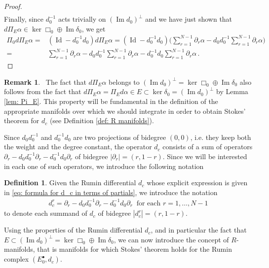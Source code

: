 \documentclass[dvipsnames]{amsart}
\theoremstyle{definition}
\newtheorem{definition}[theorem]{Definition}
\newtheorem{remark}[theorem]{Remark}
\theoremstyle{definition}
\numberwithin{equation}{section}
\begin{document}
\begin{proof}
\begin{align*}
\end{align*}
Finally, since $d_0^{-1}$ acts trivially on $(\operatorname{Im}d_0)^\perp$ and we have just shown that $d\Pi_E\alpha\in\ker\Box_0\oplus\operatorname{Im}\delta_0$, we get
\begin{align*}
    \Pi_0d\Pi_E\alpha=&\left(\operatorname{Id}-d_0^{-1}d_0\right)d\Pi_E\alpha=\left(\operatorname{Id}-d_0^{-1}d_0\right)\bigg(\sum_{r=1}^{N-1}\partial_r\alpha-d_0d_0^{-1}\sum_{r=1}^{N-1}\partial_r\alpha\bigg)\\=&\sum_{r=1}^{N-1}\partial_r\alpha-d_0d_0^{-1}\sum_{r=1}^{N-1}\partial_r\alpha-d_0^{-1}d_0\sum_{r=1}^{N-1}\partial_r\alpha\,.
\end{align*}    
\end{proof}
\begin{remark}\
    The fact that $d\Pi_E\alpha$ belongs to $\left(\operatorname{Im}d_0\right)^\perp=\ker\Box_0\oplus\operatorname{Im}\delta_0$ also follows from the fact that $d\Pi_E\alpha=\Pi_Ed\alpha\in E\subset\ker\delta_0=\left(\operatorname{Im} d_0\right)^\perp$ by Lemma \ref{lem: Pi_E}. This property will be fundamental in the definition of the appropriate manifolds over which we should integrate in order to obtain Stokes' theorem for $d_c$ (see Definition \ref{def: R manifolds}).
\end{remark}
Since $d_0d_0^{-1}$ and $d_0^{-1}d_0$ are two projections of bidegree $(0,0)$, i.e. they keep both the weight and the degree constant, the operator $d_c$ consists of a sum of operators $\partial_r-d_0d_0^{-1}\partial_r-d_0^{-1}d_0\partial_r$ of bidegree $|\partial_r|=(r,1-r)$. Since we will be interested in each one of such operators, we introduce the following notation
\begin{definition}\label{def: d_c^r}
    Given the Rumin differential $d_c$ whose explicit expression is given in \eqref{eq: formula for d_c in terms of partials}, we introduce the notation
    \begin{align*}
        d_c^r=\partial_r-d_0d_0^{-1}\partial_r-d_0^{-1}d_0\partial_r\ \text{ for each }r=1,\ldots,N-1
    \end{align*}
    to denote each summand of $d_c$ of bidegree $|d_c^r|=(r,1-r)$.
\end{definition}
Using the properties of the Rumin differential $d_c$, and in particular the fact that $E\subset(\operatorname{Im}d_0)^\perp=\ker\Box_0\oplus\operatorname{Im}\delta_0$, we can now introduce the concept of $R$-manifolds, that is manifolds for which Stokes' theorem holds for the Rumin complex $(E_0^\bullet,d_c)$.
\end{document}
